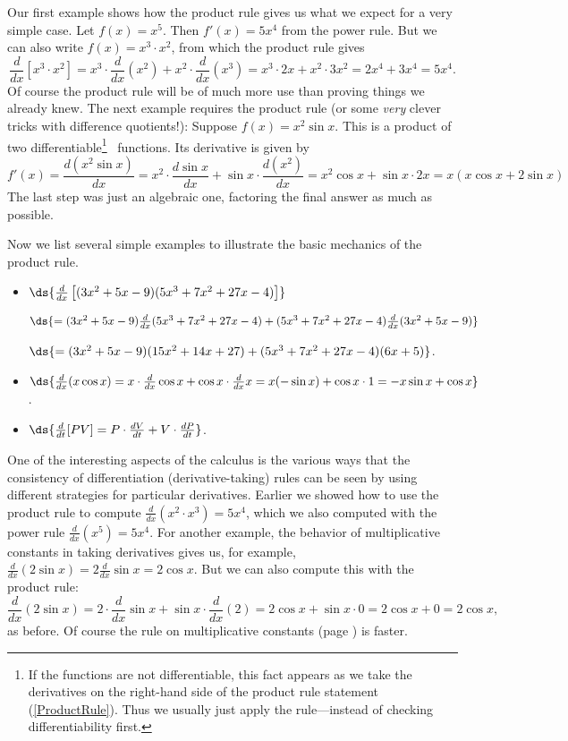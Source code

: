 Our first example shows how the product rule gives us
what we expect for a very simple case.
\bex Let $f(x)=x^5$.  Then $f'(x)=5x^4$ from the power rule.
But we can also write $f(x)=x^3\cdot x^2$, from which the 
product rule gives
$$\frac{d}{dx}\left[x^3\cdot x^2\right]
=x^3\cdot\frac{d}{dx}(x^2)+x^2\cdot\frac{d}{dx}(x^3)
=x^3\cdot2x+x^2\cdot3x^2=2x^4+3x^4=5x^4.$$
\eex
Of course the product rule will be of much more 
use than proving things we already knew.  The
next example requires the product rule
(or some {\it very} clever tricks with difference quotients!):
\bex Suppose $f(x)=x^2\sin x$.  This is a product of
two differentiable\footnote{%
If the functions are not
differentiable, this fact appears as we take the derivatives
on the right-hand side of the product rule statement
(\ref{ProductRule}).  Thus
we usually just apply the rule---instead of checking differentiability
first.}%
\  functions.  Its derivative is given by
$$f'(x)=\frac{d(x^2\sin x)}{dx}
=x^2\cdot\frac{d\sin x}{dx}+\sin x\cdot\frac{d(x^2)}{dx}
=x^2\cos x+\sin x\cdot2x
=x(x\cos x+2\sin x)
$$
The last step was just an algebraic one, factoring the final answer
as much as possible.
\eex

Now we list several simple examples to illustrate the basic mechanics
of the product rule.
\begin{itemize}
\item $\ds{\frac{d}{dx}\left[(3x^2+5x-9)(5x^3+7x^2+27x-4)\right]}$

$\ds{=(3x^2+5x-9)\frac{d}{dx}(5x^3+7x^2+27x-4)
 +(5x^3+7x^2+27x-4)\frac{d}{dx}(3x^2+5x-9)}$

$\ds{=(3x^2+5x-9)(15x^2+14x+27)+(5x^3+7x^2+27x-4)(6x+5)}$.

\item $\ds{\frac{d}{dx}(x\cos x)=x\cdot\frac{d}{dx}\cos x
                           +\cos x\cdot\frac{d}{dx}x
    =x(-\sin x)+\cos x\cdot1=-x\sin x+\cos x}$.
\item $\ds{\frac{d}{dt}[PV]=P\cdot\frac{dV}{dt}+V\cdot\frac{dP}{dt}}$.

\end{itemize}

One of the interesting aspects of the calculus is the various ways
that the consistency of differentiation (derivative-taking) rules
can be seen by using different strategies for  particular derivatives.
Earlier we showed how to use the product rule
to compute $\frac{d}{dx}(x^2\cdot x^3)=5x^4$, which we also computed
with the power rule $\frac{d}{dx}(x^5)=5x^4$.
For another example, the behavior of multiplicative constants in 
taking derivatives gives us, for example,
$\frac{d}{dx}(2\sin x)=2\frac{d}{dx}\sin x
=2\cos x$.  But we can also compute this with the product rule:
$$\frac{d}{dx}(2\sin x)=2\cdot\frac{d}{dx}\sin x+\sin x\cdot\frac{d}{dx}(2)
=2\cos x+\sin x\cdot0=2\cos x+0=2\cos x,$$
as before. Of course the rule on multiplicative constants 
(page \pageref{TheoremOnDerivativeAndMultiplicativeConstants}) is faster.


